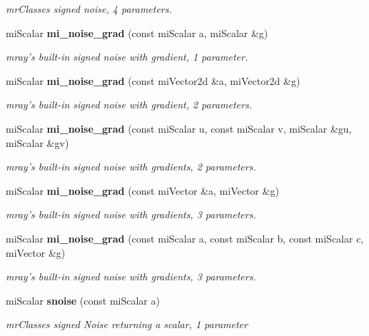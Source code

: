 \begin{CompactItemize}
\begin{CompactList}\small\item\em mr\-Classes signed noise, 4 parameters. \item\end{CompactList}\item 
mi\-Scalar {\bf mi\_\-noise\_\-grad} (const mi\-Scalar a, mi\-Scalar \&g)
\begin{CompactList}\small\item\em mray's built-in signed noise with gradient, 1 parameter. \item\end{CompactList}\item 
mi\-Scalar {\bf mi\_\-noise\_\-grad} (const mi\-Vector2d \&a, mi\-Vector2d \&g)
\begin{CompactList}\small\item\em mray's built-in signed noise with gradient, 2 parameters. \item\end{CompactList}\item 
mi\-Scalar {\bf mi\_\-noise\_\-grad} (const mi\-Scalar u, const mi\-Scalar v, mi\-Scalar \&gu, mi\-Scalar \&gv)
\begin{CompactList}\small\item\em mray's built-in signed noise with gradients, 2 parameters. \item\end{CompactList}\item 
mi\-Scalar {\bf mi\_\-noise\_\-grad} (const mi\-Vector \&a, mi\-Vector \&g)
\begin{CompactList}\small\item\em mray's built-in signed noise with gradients, 3 parameters. \item\end{CompactList}\item 
mi\-Scalar {\bf mi\_\-noise\_\-grad} (const mi\-Scalar a, const mi\-Scalar b, const mi\-Scalar c, mi\-Vector \&g)
\begin{CompactList}\small\item\em mray's built-in signed noise with gradients, 3 parameters. \item\end{CompactList}\item 
mi\-Scalar {\bf snoise} (const mi\-Scalar a)
\begin{CompactList}\small\item\em mr\-Classes signed Noise returning a scalar, 1 parameter \item\end{CompactList}\item 

\end{CompactItemize}
